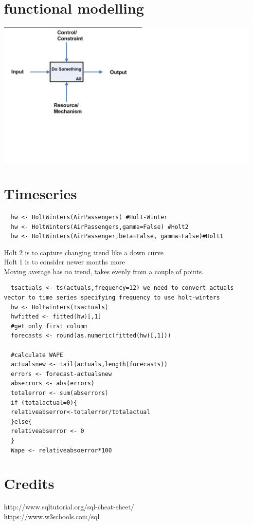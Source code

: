 \documentclass{article}
\begin{document}
\section{functional modelling}
\includegraphics{idef}
\section{Timeseries}
\begin{verbatim}
  hw <- HoltWinters(AirPassengers) #Holt-Winter
  hw <- HoltWinters(AirPassengers,gamma=False) #Holt2
  hw <- HoltWinters(AirPassenger,beta=False, gamma=False)#Holt1
\end{verbatim}
Holt 2 is to capture changing trend like a down curve\\
Holt 1 is to consider newer months more\\
Moving average has no trend, takes evenly from a couple of points.\\
\begin{verbatim}
  tsactuals <- ts(actuals,frequency=12) we need to convert actuals vector to time series specifying frequency to use holt-winters
  hw <- Holtwinters(tsactuals)
  hwfitted <- fitted(hw)[,1]
  #get only first column
  forecasts <- round(as.numeric(fitted(hw)[,1]))

  #calculate WAPE
  actualsnew <- tail(actuals,length(forecasts))
  errors <- forecast-actualsnew
  abserrors <- abs(errors)
  totalerror <- sum(abserrors)
  if (totalactual=0){
  relativeabserror<-totalerror/totalactual
  }else{
  relativeabserror <- 0
  }
  Wape <- relativeabsoerror*100
\end{verbatim}
\section{Credits}
http://www.sqltutorial.org/sql-cheat-sheet/\\
https://www.w3schools.com/sql
\end{document}
